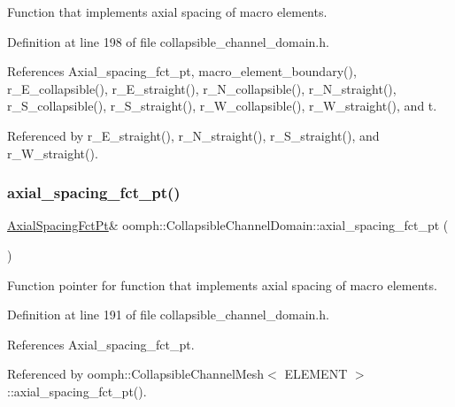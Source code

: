 Function that implements axial spacing of macro elements. 



Definition at line 198 of file collapsible\+\_\+channel\+\_\+domain.\+h.



References Axial\+\_\+spacing\+\_\+fct\+\_\+pt, macro\+\_\+element\+\_\+boundary(), r\+\_\+\+E\+\_\+collapsible(), r\+\_\+\+E\+\_\+straight(), r\+\_\+\+N\+\_\+collapsible(), r\+\_\+\+N\+\_\+straight(), r\+\_\+\+S\+\_\+collapsible(), r\+\_\+\+S\+\_\+straight(), r\+\_\+\+W\+\_\+collapsible(), r\+\_\+\+W\+\_\+straight(), and t.



Referenced by r\+\_\+\+E\+\_\+straight(), r\+\_\+\+N\+\_\+straight(), r\+\_\+\+S\+\_\+straight(), and r\+\_\+\+W\+\_\+straight().

\mbox{\label{classoomph_1_1CollapsibleChannelDomain_a17bfb9fe218dc539669bdbdf0ecc4bf8}} 
\subsubsection{\texorpdfstring{axial\+\_\+spacing\+\_\+fct\+\_\+pt()}{axial\_spacing\_fct\_pt()}}
{\footnotesize\ttfamily \hyperlink{classoomph_1_1CollapsibleChannelDomain_a317472dab112beac771ecf6442a465f5}{Axial\+Spacing\+Fct\+Pt}\& oomph\+::\+Collapsible\+Channel\+Domain\+::axial\+\_\+spacing\+\_\+fct\+\_\+pt (\begin{DoxyParamCaption}{ }\end{DoxyParamCaption})\hspace{0.3cm}{\ttfamily [inline]}}



Function pointer for function that implements axial spacing of macro elements. 



Definition at line 191 of file collapsible\+\_\+channel\+\_\+domain.\+h.



References Axial\+\_\+spacing\+\_\+fct\+\_\+pt.



Referenced by oomph\+::\+Collapsible\+Channel\+Mesh$<$ E\+L\+E\+M\+E\+N\+T $>$\+::axial\+\_\+spacing\+\_\+fct\+\_\+pt().

